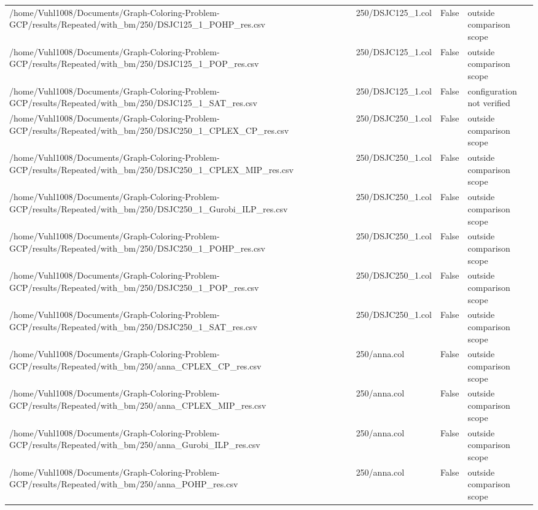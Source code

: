 \begin{table}[htbp]
\begin{tabular}{llll}
/home/Vuhl1008/Documents/Graph-Coloring-Problem-GCP/results/Repeated/with\_bm/250/DSJC125\_1\_POHP\_res.csv & 250/DSJC125\_1.col & False & outside comparison scope \\
/home/Vuhl1008/Documents/Graph-Coloring-Problem-GCP/results/Repeated/with\_bm/250/DSJC125\_1\_POP\_res.csv & 250/DSJC125\_1.col & False & outside comparison scope \\
/home/Vuhl1008/Documents/Graph-Coloring-Problem-GCP/results/Repeated/with\_bm/250/DSJC125\_1\_SAT\_res.csv & 250/DSJC125\_1.col & False & configuration not verified \\
/home/Vuhl1008/Documents/Graph-Coloring-Problem-GCP/results/Repeated/with\_bm/250/DSJC250\_1\_CPLEX\_CP\_res.csv & 250/DSJC250\_1.col & False & outside comparison scope \\
/home/Vuhl1008/Documents/Graph-Coloring-Problem-GCP/results/Repeated/with\_bm/250/DSJC250\_1\_CPLEX\_MIP\_res.csv & 250/DSJC250\_1.col & False & outside comparison scope \\
/home/Vuhl1008/Documents/Graph-Coloring-Problem-GCP/results/Repeated/with\_bm/250/DSJC250\_1\_Gurobi\_ILP\_res.csv & 250/DSJC250\_1.col & False & outside comparison scope \\
/home/Vuhl1008/Documents/Graph-Coloring-Problem-GCP/results/Repeated/with\_bm/250/DSJC250\_1\_POHP\_res.csv & 250/DSJC250\_1.col & False & outside comparison scope \\
/home/Vuhl1008/Documents/Graph-Coloring-Problem-GCP/results/Repeated/with\_bm/250/DSJC250\_1\_POP\_res.csv & 250/DSJC250\_1.col & False & outside comparison scope \\
/home/Vuhl1008/Documents/Graph-Coloring-Problem-GCP/results/Repeated/with\_bm/250/DSJC250\_1\_SAT\_res.csv & 250/DSJC250\_1.col & False & outside comparison scope \\
/home/Vuhl1008/Documents/Graph-Coloring-Problem-GCP/results/Repeated/with\_bm/250/anna\_CPLEX\_CP\_res.csv & 250/anna.col & False & outside comparison scope \\
/home/Vuhl1008/Documents/Graph-Coloring-Problem-GCP/results/Repeated/with\_bm/250/anna\_CPLEX\_MIP\_res.csv & 250/anna.col & False & outside comparison scope \\
/home/Vuhl1008/Documents/Graph-Coloring-Problem-GCP/results/Repeated/with\_bm/250/anna\_Gurobi\_ILP\_res.csv & 250/anna.col & False & outside comparison scope \\
/home/Vuhl1008/Documents/Graph-Coloring-Problem-GCP/results/Repeated/with\_bm/250/anna\_POHP\_res.csv & 250/anna.col & False & outside comparison scope \\

\end{tabular}
\end{table}

